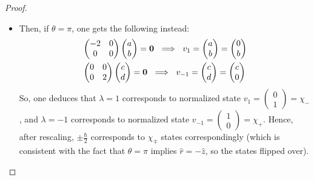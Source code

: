 \documentclass{article}
\begin{document}
\begin{proof}
\begin{itemize}
\begin{itemize}
            \item Then, if $\theta=\pi$, one gets the following instead:
            \begin{align}
                &\begin{pmatrix}
                    -2&0\\0&0
                \end{pmatrix}\begin{pmatrix}
                    a\\b
                \end{pmatrix}=\bzero\ \implies\ v_1 = \begin{pmatrix}
                    a\\b
                \end{pmatrix} = \begin{pmatrix}
                    0\\b
                \end{pmatrix}\\
                &\begin{pmatrix}
                    0&0\\0&2
                \end{pmatrix}\begin{pmatrix}
                    c\\d
                \end{pmatrix} = \bzero\ \implies \ v_{-1}=\begin{pmatrix}
                    c\\d
                \end{pmatrix}=\begin{pmatrix}
                    c\\0
                \end{pmatrix}
            \end{align}
            So, one deduces that $\lambda=1$ corresponds to normalized state $v_1 = \begin{pmatrix}
                0\\1
            \end{pmatrix}=\chi_-$, and $\lambda=-1$ corresponds to normalized state $v_{-1}=\begin{pmatrix}
                1\\0
            \end{pmatrix}=\chi_+$. Hence, after rescaling, $\pm\frac{\hbar}{2}$ corresponds to $\chi_\mp$ states correspondingly (which is consistent with the fact that $\theta=\pi$ implies $\hat{r}=-\hat{z}$, so the states flipped over).

\end{itemize}
\end{itemize}
\end{proof}
\end{document}
